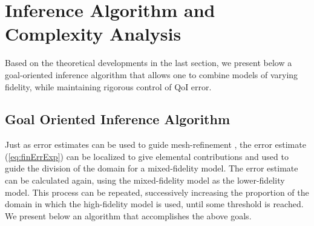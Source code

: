 \section{Inference Algorithm and Complexity Analysis}\label{sect:alg}
%
Based on the theoretical developments in the last section, we present below a goal-oriented inference algorithm that allows one to combine models of varying fidelity, while maintaining rigorous control of QoI error.
%
\subsection{Goal Oriented Inference Algorithm}
%
Just as error estimates can be used to guide mesh-refinement \cite{BecRann01}, the error estimate (\ref{eq:finErrExp}) can be localized to give elemental contributions and used to guide the division of the domain for a mixed-fidelity model. The error estimate can be calculated again, using the mixed-fidelity model as the lower-fidelity model. This process can be repeated, successively increasing the proportion of the domain in which the high-fidelity model is used, until some threshold is reached.  We present below an algorithm that accomplishes the above goals.
%
